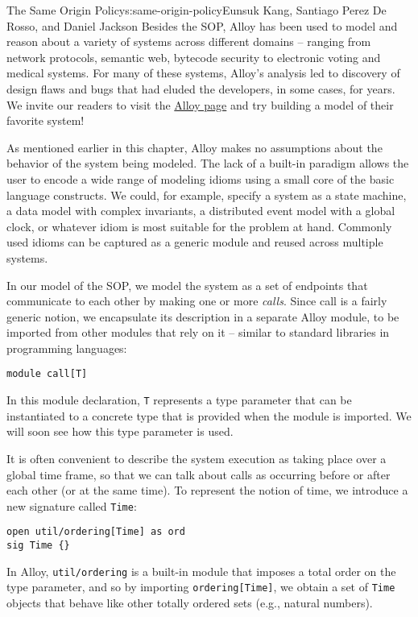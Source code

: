 \begin{aosachapter}{The Same Origin Policy}{s:same-origin-policy}{Eunsuk Kang, Santiago Perez De Rosso, and Daniel Jackson}
Besides the SOP, Alloy has been used to model and reason about a variety
of systems across different domains -- ranging from network protocols,
semantic web, bytecode security to electronic voting and medical
systems. For many of these systems, Alloy's analysis led to discovery of
design flaws and bugs that had eluded the developers, in some cases, for
years. We invite our readers to visit the
\href{http://alloy.mit.edu}{Alloy page} and try building a model of
their favorite system!

\label{appendix-reusing-modules-in-alloy}

As mentioned earlier in this chapter, Alloy makes no assumptions about
the behavior of the system being modeled. The lack of a built-in
paradigm allows the user to encode a wide range of modeling idioms using
a small core of the basic language constructs. We could, for example,
specify a system as a state machine, a data model with complex
invariants, a distributed event model with a global clock, or whatever
idiom is most suitable for the problem at hand. Commonly used idioms can
be captured as a generic module and reused across multiple systems.

In our model of the SOP, we model the system as a set of endpoints that
communicate to each other by making one or more \emph{calls}. Since call
is a fairly generic notion, we encapsulate its description in a separate
Alloy module, to be imported from other modules that rely on it --
similar to standard libraries in programming languages:

\begin{verbatim}
module call[T] 
\end{verbatim}

In this module declaration, \texttt{T} represents a type parameter that
can be instantiated to a concrete type that is provided when the module
is imported. We will soon see how this type parameter is used.

It is often convenient to describe the system execution as taking place
over a global time frame, so that we can talk about calls as occurring
before or after each other (or at the same time). To represent the
notion of time, we introduce a new signature called \texttt{Time}:

\begin{verbatim}
open util/ordering[Time] as ord
sig Time {}
\end{verbatim}

In Alloy, \texttt{util/ordering} is a built-in module that imposes a
total order on the type parameter, and so by importing
\texttt{ordering{[}Time{]}}, we obtain a set of \texttt{Time} objects
that behave like other totally ordered sets (e.g., natural numbers).


\end{aosachapter}
